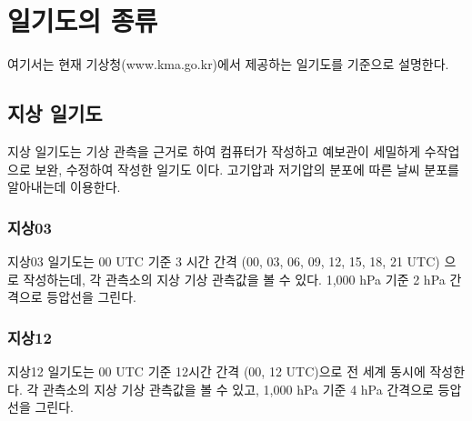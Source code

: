
\section{일기도의 종류}
여기서는 현재 기상청(www.kma.go.kr)에서 제공하는 일기도를 기준으로 설명한다.

\subsection{지상 일기도}
 지상 일기도는 기상 관측을 근거로 하여 컴퓨터가 작성하고 예보관이 세밀하게 수작업으로 보완, 수정하여 작성한 일기도 이다. 고기압과 저기압의 분포에 따른 날씨 분포를 알아내는데 이용한다.

\subsubsection{지상03}
지상03 일기도는 00 UTC 기준 3 시간 간격 (00, 03, 06, 09, 12, 15, 18, 21 UTC) 으로 작성하는데, 각 관측소의 지상 기상 관측값을 볼 수 있다. 1,000 hPa 기준 2 hPa 간격으로 등압선을 그린다. 


\subsubsection{지상12}
지상12 일기도는 00 UTC 기준 12시간 간격 (00, 12 UTC)으로 전 세계 동시에 작성한다. 각 관측소의 지상 기상 관측값을 볼 수 있고, 1,000 hPa 기준 4 hPa 간격으로 등압선을 그린다. 

